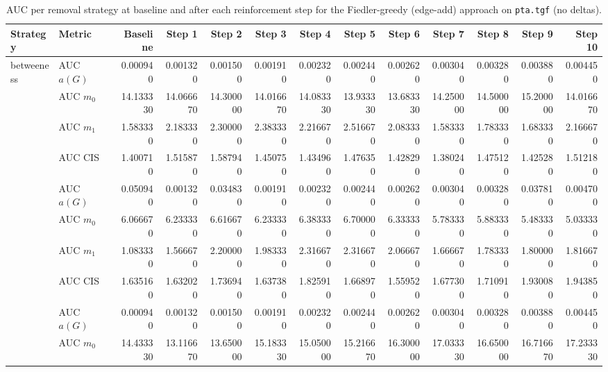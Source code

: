 \begin{table}[htbp]
  \centering
  \caption{AUC per removal strategy at baseline and after each reinforcement step for the Fiedler-greedy (edge-add) approach on \texttt{pta.tgf} (no deltas).}
  \label{tab:pta-fiedler_greedy-auc}
\setlength{\tabcolsep}{2.5pt}
  \begin{tabular}{llrrrrrrrrrrr}
    \toprule
    \textbf{Strategy} & \textbf{Metric} & \textbf{Baseline} & \textbf{Step 1} & \textbf{Step 2} & \textbf{Step 3} & \textbf{Step 4} & \textbf{Step 5} & \textbf{Step 6} & \textbf{Step 7} & \textbf{Step 8} & \textbf{Step 9} & \textbf{Step 10} \\
    \midrule
    \multirow{4}{*}{betweeness} & AUC $a(G)$ & 0.000940 & 0.001320 & 0.001500 & 0.001910 & 0.002320 & 0.002440 & 0.002620 & 0.003040 & 0.003280 & 0.003880 & 0.004450 \\
    & AUC $m_0$ & 14.133330 & 14.066670 & 14.300000 & 14.016670 & 14.083330 & 13.933330 & 13.683330 & 14.250000 & 14.500000 & 15.200000 & 14.016670 \\
    & AUC $m_1$ & 1.583330 & 2.183330 & 2.300000 & 2.383330 & 2.216670 & 2.516670 & 2.083330 & 1.583330 & 1.783330 & 1.683330 & 2.166670 \\
    & AUC CIS & 1.400710 & 1.515870 & 1.587940 & 1.450750 & 1.434960 & 1.476350 & 1.428290 & 1.380240 & 1.475120 & 1.425280 & 1.512180 \\
    \addlinespace
    \multirow{4}{*}{closeness} & AUC $a(G)$ & 0.050940 & 0.001320 & 0.034830 & 0.001910 & 0.002320 & 0.002440 & 0.002620 & 0.003040 & 0.003280 & 0.037810 & 0.004700 \\
    & AUC $m_0$ & 6.066670 & 6.233330 & 6.616670 & 6.233330 & 6.383330 & 6.700000 & 6.333330 & 5.783330 & 5.883330 & 5.483330 & 5.033330 \\
    & AUC $m_1$ & 1.083330 & 1.566670 & 2.200000 & 1.983330 & 2.316670 & 2.316670 & 2.066670 & 1.666670 & 1.783330 & 1.800000 & 1.816670 \\
    & AUC CIS & 1.635160 & 1.632020 & 1.736940 & 1.637380 & 1.825910 & 1.668970 & 1.559520 & 1.677300 & 1.710910 & 1.930080 & 1.943850 \\
    \addlinespace
    \multirow{4}{*}{core influence} & AUC $a(G)$ & 0.000940 & 0.001320 & 0.001500 & 0.001910 & 0.002320 & 0.002440 & 0.002620 & 0.003040 & 0.003280 & 0.003880 & 0.004450 \\
    & AUC $m_0$ & 14.433330 & 13.116670 & 13.650000 & 15.183330 & 15.050000 & 15.216670 & 16.300000 & 17.033330 & 16.650000 & 16.716670 & 17.233330 \\

\end{tabular}
\end{table}
